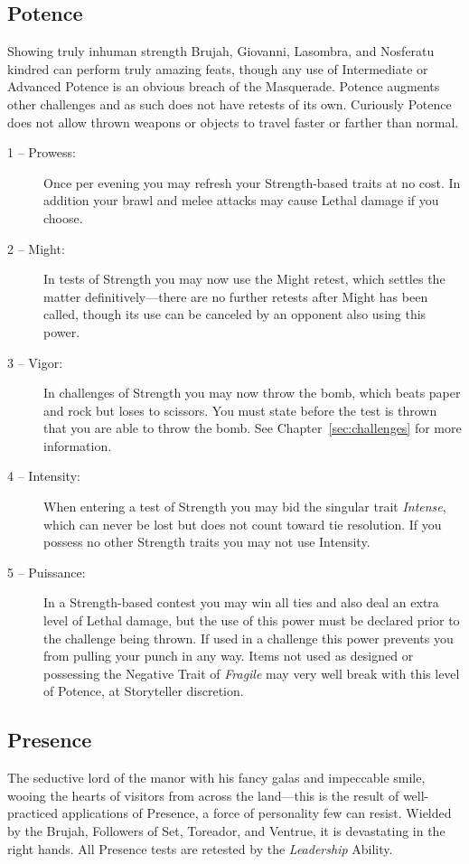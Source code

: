 \subsection{Potence}
Showing truly inhuman strength Brujah, Giovanni, Lasombra, and Nosferatu kindred can perform truly 
amazing feats, though any use of Intermediate or Advanced Potence is an obvious breach of the Masquerade.  
Potence augments other challenges and as such does not have retests of its own.  Curiously Potence does 
not allow thrown weapons or objects to travel faster or farther than normal.

\begin{description}
	\item[1 -- Prowess:]  Once per evening you may refresh your Strength-based traits at no cost.  In addition 
	your brawl and melee attacks may cause Lethal damage if you choose.
	\item[2 -- Might:]  In tests of Strength you may now use the Might retest, which settles the matter 
	definitively---there are no further retests after Might has been called, though its use can be canceled 
	by an opponent also using this power.
	\item[3 -- Vigor:]  In challenges of Strength you may now throw the bomb, which beats paper and rock but 
	loses to scissors.  You must state before the test is thrown that you are able to throw the bomb. See 
	Chapter~\ref{sec:challenges} for more information.
	\item[4 -- Intensity:]  When entering a test of Strength you may bid the singular trait \emph{Intense}, 
	which can never be lost but does not count toward tie resolution.  If you possess no other Strength traits 
	you may not use Intensity.
	\item[5 -- Puissance:]  In a Strength-based contest you may win all ties and also deal an extra level 
	of Lethal damage, but the use of this power must be declared prior to the challenge being thrown.  If used 
	in a challenge this power prevents you from pulling your punch in any way.  Items not used as designed or 
	possessing the Negative Trait of \emph{Fragile} may very well break with this level of Potence, at 
	Storyteller discretion.
\end{description}

\subsection{Presence}
The seductive lord of the manor with his fancy galas and impeccable smile, wooing the hearts of visitors from 
across the land---this is the result of well-practiced applications of Presence, a force of personality few 
can resist.  Wielded by the Brujah, Followers of Set, Toreador, and Ventrue, it is devastating in the right 
hands.  All Presence tests are retested by the \emph{Leadership} Ability.

